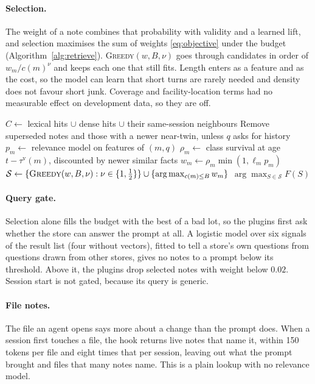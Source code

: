 \paragraph{Selection.} The weight of a note combines that probability with validity and a learned lift, and selection maximises the sum of weights \eqref{eq:objective} under the budget (Algorithm~\ref{alg:retrieve}). \textsc{Greedy}$(w,B,\nu)$ goes through candidates in order of $w_m/c(m)^{\nu}$ and keeps each one that still fits. Length enters as a feature and as the cost, so the model can learn that short turns are rarely needed and density does not favour short junk. Coverage and facility-location terms had no measurable effect on development data, so they are off.

\begin{algorithm}[t]
\caption{\textsc{Retrieve}$(q,B,t)$}\label{alg:retrieve}
\begin{algorithmic}[1]
\State $C\gets$ lexical hits $\cup$ dense hits $\cup$ their same-session neighbours
\State Remove superseded notes and those with a newer near-twin, unless $q$ asks for history
  \State $p_m\gets$ relevance model on features of $(m,q)$
  \State $\rho_m\gets$ class survival at age $t-\tau^{\mathrm{v}}(m)$, discounted by newer similar facts
  \State $w_m\gets\rho_m\min(1,\ell_m p_m)$ 
\EndFor
\State $\mathcal{S}\gets\{\textsc{Greedy}(w,B,\nu):\nu\in\{1,\tfrac12\}\}\cup\{\arg\max_{c(m)\le B}w_m\}$
\State \Return $\arg\max_{S\in\mathcal{S}}F(S)$
\end{algorithmic}
\end{algorithm}

\paragraph{Query gate.} Selection alone fills the budget with the best of a bad lot, so the plugins first ask whether the store can answer the prompt at all. A logistic model over six signals of the result list (four without vectors), fitted to tell a store's own questions from questions drawn from other stores, gives no notes to a prompt below its threshold. Above it, the plugins drop selected notes with weight below $0.02$. Session start is not gated, because its query is generic.

\paragraph{File notes.} The file an agent opens says more about a change than the prompt does. When a session first touches a file, the hook returns live notes that name it, within 150 tokens per file and eight times that per session, leaving out what the prompt brought and files that many notes name. This is a plain lookup with no relevance model.

